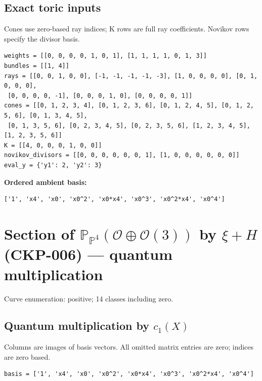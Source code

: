 \documentclass[10pt,a4paper]{article}
\begin{document}
\subsection*{Exact toric inputs}
Cones use zero-based ray indices; K rows are full ray coefficients. Novikov rows specify the divisor basis.

\begin{lstlisting}
weights = [[0, 0, 0, 0, 1, 0, 1], [1, 1, 1, 1, 0, 1, 3]]
bundles = [[1, 4]]
rays = [[0, 0, 1, 0, 0], [-1, -1, -1, -1, -3], [1, 0, 0, 0, 0], [0, 1, 0, 0, 0],
 [0, 0, 0, 0, -1], [0, 0, 0, 1, 0], [0, 0, 0, 0, 1]]
cones = [[0, 1, 2, 3, 4], [0, 1, 2, 3, 6], [0, 1, 2, 4, 5], [0, 1, 2, 5, 6], [0, 1, 3, 4, 5],
 [0, 1, 3, 5, 6], [0, 2, 3, 4, 5], [0, 2, 3, 5, 6], [1, 2, 3, 4, 5], [1, 2, 3, 5, 6]]
K = [[4, 0, 0, 0, 1, 0, 0]]
novikov_divisors = [[0, 0, 0, 0, 0, 0, 1], [1, 0, 0, 0, 0, 0, 0]]
eval_y = {'y1': 2, 'y2': 3}
\end{lstlisting}

\textbf{Ordered ambient basis:}
\begin{lstlisting}
['1', 'x4', 'x0', 'x0^2', 'x0*x4', 'x0^3', 'x0^2*x4', 'x0^4']
\end{lstlisting}

\clearpage\section*{Section of $\mathbb P_{\mathbb P^{4}}(\mathcal O\oplus \mathcal O(3))$ by $\xi +H$ (CKP-006) --- quantum multiplication}

Curve enumeration: positive; 14 classes including zero.
\subsection*{Quantum multiplication by $c_1(X)$}
Columns are images of basis vectors. All omitted matrix entries are zero; indices are zero based.

\begin{lstlisting}
basis = ['1', 'x4', 'x0', 'x0^2', 'x0*x4', 'x0^3', 'x0^2*x4', 'x0^4']
\end{lstlisting}
\end{document}
